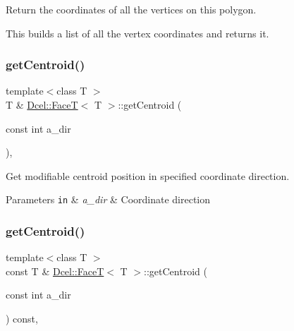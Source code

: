 Return the coordinates of all the vertices on this polygon. 

This builds a list of all the vertex coordinates and returns it. \mbox{\label{classDcel_1_1FaceT_a43e5b9aebe8736a42568ae0e6fbb6db3}} 
\subsubsection{\texorpdfstring{get\+Centroid()}{getCentroid()}\hspace{0.1cm}{\footnotesize\ttfamily [1/2]}}
{\footnotesize\ttfamily template$<$class T $>$ \\
T \& \hyperlink{classDcel_1_1FaceT}{Dcel\+::\+FaceT}$<$ T $>$\+::get\+Centroid (\begin{DoxyParamCaption}\item[{const int}]{a\+\_\+dir }\end{DoxyParamCaption})\hspace{0.3cm}{\ttfamily [inline]}, {\ttfamily [noexcept]}}



Get modifiable centroid position in specified coordinate direction. 


\begin{DoxyParams}[1]{Parameters}
\mbox{\tt in}  & {\em a\+\_\+dir} & Coordinate direction \\
\hline
\end{DoxyParams}
\mbox{\label{classDcel_1_1FaceT_ac835d260a630e303babd7f87eb7d5a1a}} 
\subsubsection{\texorpdfstring{get\+Centroid()}{getCentroid()}\hspace{0.1cm}{\footnotesize\ttfamily [2/2]}}
{\footnotesize\ttfamily template$<$class T $>$ \\
const T \& \hyperlink{classDcel_1_1FaceT}{Dcel\+::\+FaceT}$<$ T $>$\+::get\+Centroid (\begin{DoxyParamCaption}\item[{const int}]{a\+\_\+dir }\end{DoxyParamCaption}) const\hspace{0.3cm}{\ttfamily [inline]}, {\ttfamily [noexcept]}}



